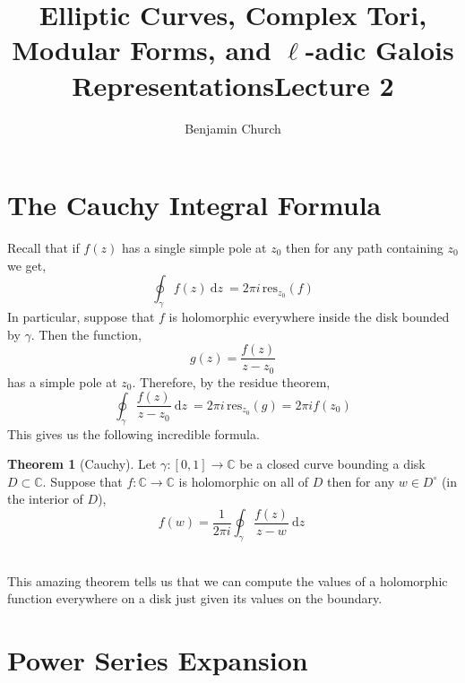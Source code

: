 \documentclass{article}
\title{Elliptic Curves, Complex Tori, Modular Forms, and $\ell$-adic Galois Representations}
\author{Benjamin Church}
\newcommand{\C}{\mathbb{C}}
\renewcommand{\d}[1]{\: \mathrm{d}#1 \:}
\theoremstyle{definition}
\newtheorem{theorem}{Theorem}[section]
\newcommand{\res}{\mathrm{res}}
\begin{document}
\title{Lecture 2}

\maketitle

\section{The Cauchy Integral Formula}

Recall that if $f(z)$ has a single simple pole at $z_0$ then for any path containing $z_0$ we get,
\[ \oint_{\gamma} f(z) \d{z} = 2 \pi i \, \res_{z_0}(f) \]
In particular, suppose that $f$ is holomorphic everywhere inside the disk bounded by $\gamma$. Then the function,
\[ g(z) = \frac{f(z)}{z - z_0} \]
has a simple pole at $z_0$. Therefore, by the residue theorem,
\[ \oint_{\gamma} \frac{f(z)}{z - z_0} \d{z} = 2 \pi i \, \res_{z_0}(g) = 2 \pi i f(z_0) \]
This gives us the following incredible formula.

\begin{theorem}[Cauchy]
Let $\gamma : [0,1] \to \C$ be a closed curve bounding a disk $D \subset \C$. Suppose that $f : \C \to \C$ is holomorphic on all of $D$ then for any $w \in D^\circ$ (in the interior of $D$),
\[  f(w) = \frac{1}{2 \pi i} \oint_{\gamma} \frac{f(z)}{z - w} \d{z} \]
\end{theorem}

\noindent\\
This amazing theorem tells us that we can compute the values of a holomorphic function everywhere on a disk just given its values on the boundary.

\section{Power Series Expansion}
\end{document}
